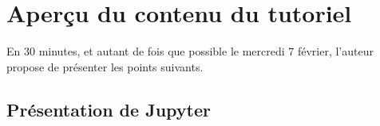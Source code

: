 \documentclass[runningheads]{llncs}
\newcommand{\Jupyter}{\textbf{Jupyter}}
\begin{document}


\section{Aperçu du contenu du tutoriel}

En 30 minutes, et autant de fois que possible le mercredi 7 février, l'auteur propose de présenter les points suivants.


\subsection*{Présentation de \Jupyter}
\end{document}
